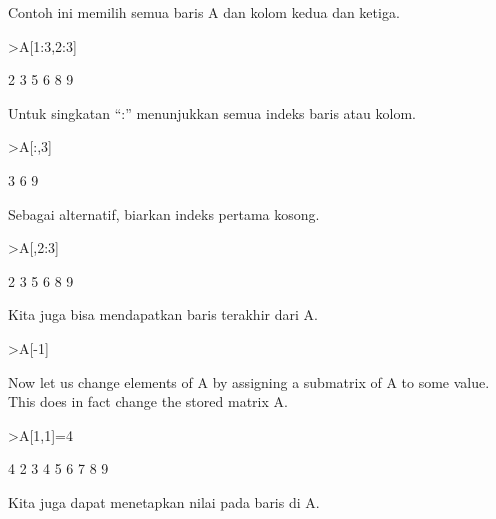 \documentclass{article}
\begin{document}
\begin{eulernotebook}
\begin{eulercomment}
Contoh ini memilih semua baris A dan kolom kedua dan ketiga.
\end{eulercomment}
\begin{eulerprompt}
>A[1:3,2:3]
\end{eulerprompt}
\begin{euleroutput}
              2             3 
              5             6 
              8             9 
\end{euleroutput}
\begin{eulercomment}
Untuk singkatan “:” menunjukkan semua indeks baris atau kolom.
\end{eulercomment}
\begin{eulerprompt}
>A[:,3]
\end{eulerprompt}
\begin{euleroutput}
              3 
              6 
              9 
\end{euleroutput}
\begin{eulercomment}
Sebagai alternatif, biarkan indeks pertama kosong.
\end{eulercomment}
\begin{eulerprompt}
>A[,2:3]
\end{eulerprompt}
\begin{euleroutput}
              2             3 
              5             6 
              8             9 
\end{euleroutput}
\begin{eulercomment}
Kita juga bisa mendapatkan baris terakhir dari A.
\end{eulercomment}
\begin{eulerprompt}
>A[-1]
\end{eulerprompt}
\begin{euleroutput}
  [7,  8,  9]
\end{euleroutput}
\begin{eulercomment}
Now let us change elements of A by assigning a submatrix of A to some
value. This does in fact change the stored matrix A.
\end{eulercomment}
\begin{eulerprompt}
>A[1,1]=4
\end{eulerprompt}
\begin{euleroutput}
              4             2             3 
              4             5             6 
              7             8             9 
\end{euleroutput}
\begin{eulercomment}
Kita juga dapat menetapkan nilai pada baris di A.

\end{eulercomment}
\end{eulernotebook}
\end{document}
